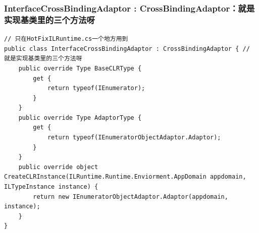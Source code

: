 \documentclass[9pt, b5paper]{article}
\begin{document}
\subsubsection{InterfaceCrossBindingAdaptor : CrossBindingAdaptor：就是实现基类里的三个方法呀}
\label{sec-5-1-3}
\begin{verbatim}
// 只在HotFixILRuntime.cs一个地方用到
public class InterfaceCrossBindingAdaptor : CrossBindingAdaptor { // 就是实现基类里的三个方法呀
    public override Type BaseCLRType {
        get {
            return typeof(IEnumerator);
        }
    }
    public override Type AdaptorType {
        get {
            return typeof(IEnumeratorObjectAdaptor.Adaptor);
        }
    }
    public override object CreateCLRInstance(ILRuntime.Runtime.Enviorment.AppDomain appdomain, ILTypeInstance instance) {
        return new IEnumeratorObjectAdaptor.Adaptor(appdomain, instance);
    }
}
\end{verbatim}
\end{document}
